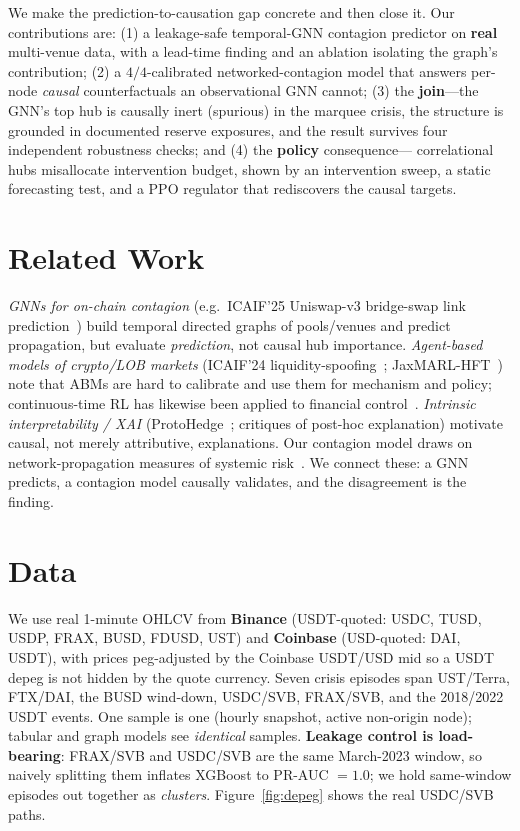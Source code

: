 \documentclass[sigconf,nonacm]{acmart}
\begin{document}
We make the prediction-to-causation gap concrete and then close it. Our contributions are:
(1) a leakage-safe temporal-GNN contagion predictor on \textbf{real} multi-venue data, with a
lead-time finding and an ablation isolating the graph's contribution; (2) a $4/4$-calibrated
networked-contagion model that answers per-node \emph{causal} counterfactuals an observational
GNN cannot; (3) the \textbf{join}---the GNN's top hub is causally inert (spurious) in the
marquee crisis, the structure is grounded in documented reserve exposures, and the result
survives four independent robustness checks; and (4) the \textbf{policy} consequence---
correlational hubs misallocate intervention budget, shown by an intervention sweep, a static
forecasting test, and a PPO regulator that rediscovers the causal targets.

\section{Related Work}
\emph{GNNs for on-chain contagion} (e.g.\ ICAIF'25 Uniswap-v3 bridge-swap link
prediction~\cite{zhou2025bridge}) build temporal directed graphs of pools/venues and predict
propagation, but evaluate \emph{prediction}, not causal hub importance. \emph{Agent-based models
of crypto/LOB markets} (ICAIF'24 liquidity-spoofing~\cite{gu2024spoofability};
JaxMARL-HFT~\cite{mohl2025jaxmarl}) note that ABMs are hard to calibrate and use them for
mechanism and policy; continuous-time RL has likewise been applied to financial
control~\cite{huang2025ctrl}. \emph{Intrinsic interpretability / XAI}
(ProtoHedge~\cite{faloughi2025protohedge}; critiques of post-hoc explanation) motivate causal,
not merely attributive, explanations. Our contagion model draws on network-propagation measures
of systemic risk~\cite{battiston2012debtrank}. We connect these: a GNN predicts, a contagion
model causally validates, and the disagreement is the finding.

\section{Data}
We use real 1-minute OHLCV from \textbf{Binance} (USDT-quoted: USDC, TUSD, USDP, FRAX, BUSD,
FDUSD, UST) and \textbf{Coinbase} (USD-quoted: DAI, USDT), with prices peg-adjusted by the
Coinbase USDT/USD mid so a USDT depeg is not hidden by the quote currency. Seven crisis episodes
span UST/Terra, FTX/DAI, the BUSD wind-down, USDC/SVB, FRAX/SVB, and the 2018/2022 USDT events.
One sample is one (hourly snapshot, active non-origin node); tabular and graph models see
\emph{identical} samples. \textbf{Leakage control is load-bearing}: FRAX/SVB and USDC/SVB are
the same March-2023 window, so naively splitting them inflates XGBoost to PR-AUC $=1.0$; we hold
same-window episodes out together as \emph{clusters}. Figure~\ref{fig:depeg} shows the real
USDC/SVB paths.
\end{document}
